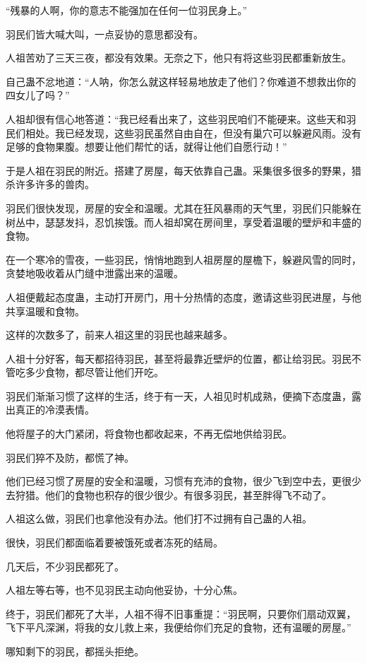 \begin{this_body}
“残暴的人啊，你的意志不能强加在任何一位羽民身上。”

羽民们皆大喊大叫，一点妥协的意思都没有。

人祖苦劝了三天三夜，都没有效果。无奈之下，他只有将这些羽民都重新放生。

自己蛊不忿地道：“人呐，你怎么就这样轻易地放走了他们？你难道不想救出你的四女儿了吗？”

人祖却很有信心地答道：“我已经看出来了，这些羽民咱们不能硬来。这些天和羽民们相处。我已经发现，这些羽民虽然自由自在，但没有巢穴可以躲避风雨。没有足够的食物果腹。想要让他们帮忙的话，就得让他们自愿行动！”

于是人祖在羽民的附近。搭建了房屋，每天依靠自己蛊。采集很多很多的野果，猎杀许多许多的兽肉。

羽民们很快发现，房屋的安全和温暖。尤其在狂风暴雨的天气里，羽民们只能躲在树丛中，瑟瑟发抖，忍饥挨饿。而人祖却窝在房间里，享受着温暖的壁炉和丰盛的食物。

在一个寒冷的雪夜，一些羽民，悄悄地跑到人祖房屋的屋檐下，躲避风雪的同时，贪婪地吸收着从门缝中泄露出来的温暖。

人祖便戴起态度蛊，主动打开房门，用十分热情的态度，邀请这些羽民进屋，与他共享温暖和食物。

这样的次数多了，前来人祖这里的羽民也越来越多。

人祖十分好客，每天都招待羽民，甚至将最靠近壁炉的位置，都让给羽民。羽民不管吃多少食物，都尽管让他们开吃。

羽民们渐渐习惯了这样的生活，终于有一天，人祖见时机成熟，便摘下态度蛊，露出真正的冷漠表情。

他将屋子的大门紧闭，将食物也都收起来，不再无偿地供给羽民。

羽民们猝不及防，都慌了神。

他们已经习惯了房屋的安全和温暖，习惯有充沛的食物，很少飞到空中去，更很少去狩猎。他们的食物也积存的很少很少。有很多羽民，甚至胖得飞不动了。

人祖这么做，羽民们也拿他没有办法。他们打不过拥有自己蛊的人祖。

很快，羽民们都面临着要被饿死或者冻死的结局。

几天后，不少羽民都死了。

人祖左等右等，也不见羽民主动向他妥协，十分心焦。

终于，羽民们都死了大半，人祖不得不旧事重提：“羽民啊，只要你们扇动双翼，飞下平凡深渊，将我的女儿救上来，我便给你们充足的食物，还有温暖的房屋。”

哪知剩下的羽民，都摇头拒绝。


\end{this_body}
